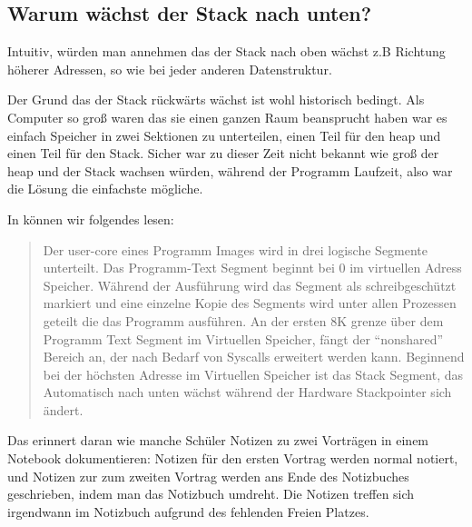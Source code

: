 
\subsection{Warum wächst der Stack nach unten?}
\label{stack_grow_backwards}

Intuitiv, würden man annehmen das der Stack nach oben wächst z.B Richtung höherer Adressen, so wie bei jeder anderen Datenstruktur.

Der Grund das der Stack rückwärts wächst ist wohl historisch bedingt. Als Computer so groß waren das sie einen ganzen Raum beansprucht haben war es einfach Speicher in zwei Sektionen zu unterteilen, einen Teil für den \gls{heap} und einen Teil für den Stack. Sicher war zu dieser Zeit nicht bekannt wie groß der \gls{heap} und der Stack wachsen würden, während der Programm Laufzeit, also war die Lösung die einfachste mögliche.



In \RitchieThompsonUNIX können wir folgendes lesen:

\begin{framed}
\begin{quotation}
Der user-core eines Programm Images wird in drei logische Segmente unterteilt. Das Programm-Text Segment beginnt bei 0 im virtuellen Adress Speicher. Während der Ausführung wird das Segment als schreibgeschützt markiert und eine einzelne Kopie des Segments wird unter allen Prozessen geteilt die das Programm ausführen. An der ersten 8K grenze über dem Programm Text Segment im Virtuellen Speicher, fängt der ``nonshared'' Bereich an, der nach Bedarf von Syscalls erweitert werden kann. Beginnend bei der höchsten Adresse im Virtuellen Speicher ist das Stack Segment, das Automatisch nach unten wächst während der Hardware Stackpointer sich ändert.
\end{quotation}
\end{framed}

Das erinnert daran wie manche Schüler Notizen zu  zwei Vorträgen in einem Notebook dokumentieren:
Notizen für den ersten Vortrag werden normal notiert, und Notizen zur zum zweiten Vortrag werden 
ans Ende des Notizbuches geschrieben, indem man das Notizbuch umdreht. Die Notizen treffen sich irgendwann
im Notizbuch aufgrund des fehlenden Freien Platzes.

